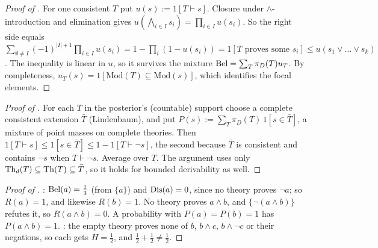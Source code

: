 \begin{proof}[Proof of ]
For one consistent $T$ put $u(s):=1[T\vdash s]$. Closure under $\wedge$-introduction and elimination gives $u(\bigwedge_{i\in I}s_i)=\prod_{i\in I}u(s_i)$. So the right side equals $\sum_{\emptyset\ne I}(-1)^{|I|+1}\prod_{i\in I}u(s_i)=1-\prod_i(1-u(s_i))=1[T\text{ proves some }s_i]\le u(s_1\vee\dots\vee s_k)$. The inequality is linear in $u$, so it survives the mixture $\mathrm{Bel}=\sum_T\pi_D(T)u_T$. By completeness, $u_T(s)=1[\mathrm{Mod}(T)\subseteq\mathrm{Mod}(s)]$, which identifies the focal elements.
\end{proof}

\begin{proof}[Proof of ]
For each $T$ in the posterior's (countable) support choose a complete consistent extension $\bar T$ (Lindenbaum), and put $P(s):=\sum_T\pi_D(T)\,1[s\in\bar T]$, a mixture of point masses on complete theories. Then $1[T\vdash s]\le1[s\in\bar T]\le1-1[T\vdash\neg s]$, the second because $\bar T$ is consistent and contains $\neg s$ when $T\vdash\neg s$. Average over $T$. The argument uses only $\mathrm{Th}_d(T)\subseteq\mathrm{Th}(T)\subseteq\bar T$, so it holds for bounded derivability as well.
\end{proof}

\begin{proof}[Proof of ]
: $\mathrm{Bel}(a)=\tfrac13$ (from $\{a\}$) and $\mathrm{Dis}(a)=0$, since no theory proves $\neg a$; so $R(a)=1$, and likewise $R(b)=1$. No theory proves $a\wedge b$, and $\{\neg(a\wedge b)\}$ refutes it, so $R(a\wedge b)=0$. A probability with $P(a)=P(b)=1$ has $P(a\wedge b)=1$.
: the empty theory proves none of $b$, $b\wedge c$, $b\wedge\neg c$ or their negations, so each gets $H=\tfrac12$, and $\tfrac12+\tfrac12\ne\tfrac12$.
\end{proof}

